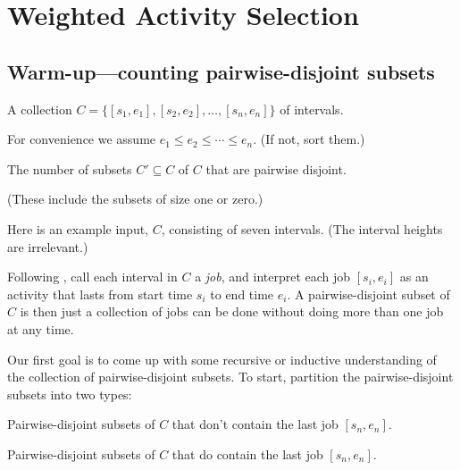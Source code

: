 

\section{Weighted Activity Selection}\label{dp: sec: activity selection}

\subsection*{Warm-up---counting pairwise-disjoint subsets}

\begin{mylist}
\item[\bf input:]
  A collection $C=\{[s_1, e_1], [s_2, e_2], \ldots, [s_n, e_n]\}$ of intervals.

  For convenience we assume $e_1 \le e_2 \le \cdots \le e_n$.  (If not, sort them.)

\item[\bf output:]
  The number of subsets $C'\subseteq C$ of $C$ that are pairwise disjoint.

  (These include the subsets of size one or zero.)
\end{mylist}

Here is an example input, $C$, consisting of seven intervals.  (The interval heights are irrelevant.)

\begin{center}
\end{center}

Following ,
call each interval in $C$ a \emph{job}, and interpret each job $[s_i, e_i]$ as
an activity that lasts from start time $s_i$ to end time $e_i$.  A pairwise-disjoint subset of $C$
is then just a collection of jobs can be done without doing more than one job at any time.

Our first goal is to come up with some recursive or inductive understanding
of the collection of pairwise-disjoint subsets.  To start, partition the pairwise-disjoint subsets into two types:
\begin{mylist}
\item[(A)] Pairwise-disjoint subsets of $C$ that don't contain the last job $[s_n, e_n]$. 
\item[(B)] Pairwise-disjoint subsets of $C$ that do contain the last job $[s_n, e_n]$. 
\end{mylist}

